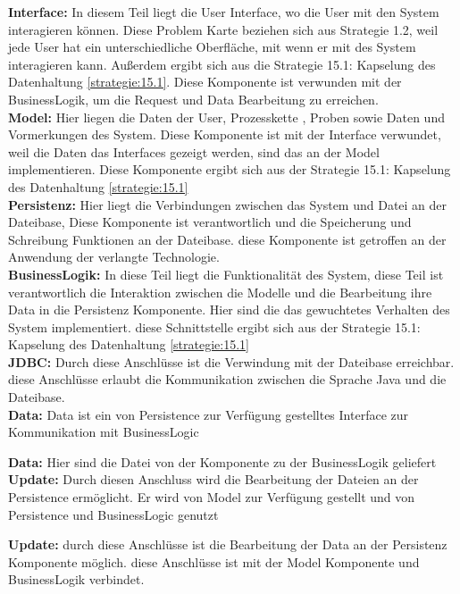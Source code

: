 \documentclass[enabledeprecatedfontcommands,fontsize=12pt,paper=a4,twoside]{scrartcl}
\begin{document}
\textbf{Interface:} In diesem Teil liegt die User Interface, wo die User mit den System interagieren können. Diese Problem Karte beziehen sich aus Strategie 1.2, weil jede User hat ein unterschiedliche Oberfläche, mit wenn er mit des System interagieren kann. Außerdem ergibt sich aus die Strategie 15.1: Kapselung des Datenhaltung \ref{strategie:15.1}.
Diese Komponente ist verwunden mit der BusinessLogik, um die Request und Data Bearbeitung zu erreichen.\\
\textbf{Model:} Hier liegen die Daten der User, Prozesskette , Proben sowie Daten und Vormerkungen des System. Diese Komponente ist mit der Interface verwundet, weil die Daten das Interfaces gezeigt werden, sind das an der Model implementieren. Diese Komponente ergibt sich aus der  Strategie 15.1: Kapselung des Datenhaltung \ref{strategie:15.1} \\
\textbf{Persistenz:} Hier liegt die Verbindungen zwischen das System und Datei an der Dateibase, Diese Komponente ist verantwortlich und die Speicherung und Schreibung Funktionen an der Dateibase. diese Komponente  ist getroffen an der Anwendung der verlangte Technologie.  \\
\textbf{BusinessLogik:} In diese Teil liegt die Funktionalität des System, diese Teil ist verantwortlich die Interaktion zwischen die Modelle und die Bearbeitung ihre Data in die Persistenz Komponente. Hier sind die das gewuchtetes Verhalten des System implementiert. diese Schnittstelle ergibt sich aus der Strategie 15.1: Kapselung des Datenhaltung \ref{strategie:15.1} \\
\textbf{JDBC:} Durch diese Anschlüsse  ist die Verwindung mit der Dateibase erreichbar. diese Anschlüsse erlaubt die Kommunikation zwischen die Sprache Java und die Dateibase.  \\

{%
\textbf{Data:} Data ist ein von Persistence zur Verfügung gestelltes Interface zur Kommunikation mit BusinessLogic
}

\textbf{Data:} Hier sind die Datei von der Komponente  zu der BusinessLogik  geliefert \\

{%
\textbf{Update:} Durch diesen Anschluss wird die Bearbeitung der Dateien an der Persistence ermöglicht. Er wird von Model zur Verfügung gestellt und von Persistence und BusinessLogic genutzt
}

\textbf{Update:} durch diese Anschlüsse ist die Bearbeitung der Data an der Persistenz Komponente  möglich. diese Anschlüsse ist mit der Model Komponente und BusinessLogik verbindet.  \\
\end{document}
